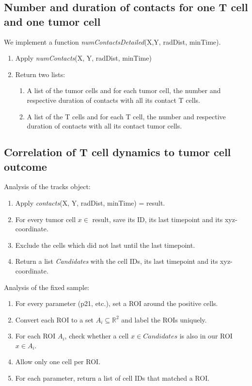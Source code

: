 \documentclass{report}
\begin{document}
\subsection{Number and duration of contacts for one T cell and one tumor cell}

We implement a function \textit{numContactsDetailed}(X,Y, radDist, minTime).

\begin{enumerate}
	\item Apply \textit{numContacts}(X, Y, radDist, minTime)
	\item Return two lists:
		\begin{enumerate}
			\item A list of the tumor cells and for each tumor cell, the number and respective duration of contacts with all its contact T cells.
			\item  A list of the T cells and for each T cell, the number and respective duration of contacts with all its contact tumor cells.
		\end{enumerate}
\end{enumerate}


\subsection{Correlation of  T cell dynamics to tumor cell outcome}

Analysis of the tracks object:

\begin{enumerate}
	\item Apply \textit{contacts}(X, Y, radDist, minTime) = result.
	\item For every tumor cell $x\in$ result, save its ID, its last timepoint and its xyz-coordinate.
	\item Exclude the cells which did not last until the last timepoint.
	\item Return a list \textit{Candidates} with the cell IDs, its last timepoint and its xyz-coordinate.
\end{enumerate}

Analysis of the fixed sample:

\begin{enumerate}
	\item For every parameter (p21, etc.), set a ROI around the positive cells.
	\item Convert each ROI to a set $A_i \subseteq \mathbb{R}^2$ and label the ROIs uniquely.
	\item For each ROI $A_i$, check whether a cell $x\in\textit{Candidates}$ is also in our ROI $x\in A_i$.
	\item Allow only one cell per ROI.
	\item For each parameter, return a list of cell IDs that matched a ROI.
\end{enumerate}
\end{document}
